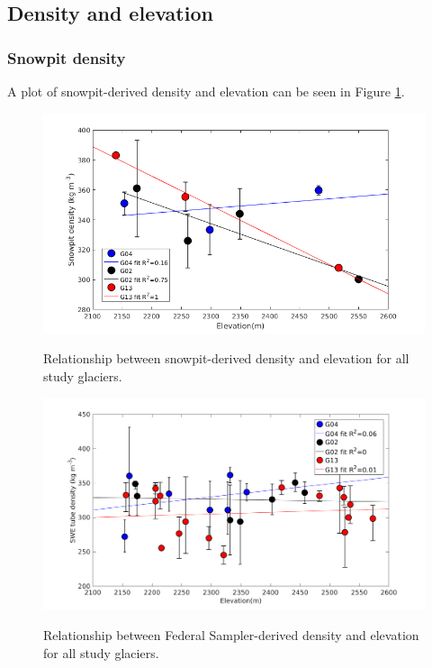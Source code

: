 \documentclass[12pt]{article}
\begin{document}
\subsection*{Density and elevation}

\subsubsection*{Snowpit density}

A plot of snowpit-derived density and elevation can be seen in Figure \ref{fig:elev_snowpit}. 

\begin{figure} 
	\centering
	\includegraphics[width = \textwidth]{ElevationVsSnowpit_all.png}\\
	\caption{Relationship between snowpit-derived density and elevation for all study glaciers.}
	\label{fig:elev_snowpit}
\end{figure}

\begin{figure} 
	\centering
	\includegraphics[width = \textwidth]{ElevationVsSWEtube_all.png}\\
	\caption{Relationship between Federal Sampler-derived density and elevation for all study glaciers.}
	\label{fig:elev_tube}
\end{figure}
\end{document}
